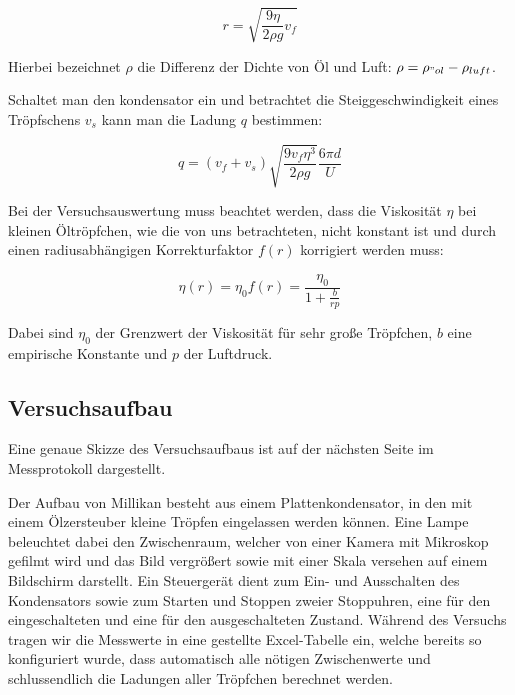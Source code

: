 \documentclass{article}
\begin{document}
\begin{equation}
    r = \sqrt{\frac{9\eta}{2\rho g}v_f}
    \label{eq:r}
\end{equation}

Hierbei bezeichnet $\rho$ die Differenz der Dichte von Öl und Luft: $\rho = \rho_{"ol} - \rho_{luft}$.

Schaltet man den kondensator ein und betrachtet die Steiggeschwindigkeit eines Tröpfschens $v_s$ kann man die Ladung $q$ bestimmen:

\begin{equation}
    q = (v_f + v_s) \sqrt{\frac{9v_f \eta^3}{2 \rho g}} \frac{6 \pi d}{U}
    \label{eq:q}
\end{equation}

Bei der Versuchsauswertung muss beachtet werden, dass die Viskosität $\eta$ bei kleinen Öltröpfchen, wie die von uns betrachteten, nicht konstant ist und durch einen radiusabhängigen Korrekturfaktor $f(r)$ korrigiert werden muss:

\begin{equation}
    \eta(r) = \eta_0 f(r) = \frac{\eta_0}{1+\frac{b}{rp}}
    \label{eq:eta}
\end{equation}

Dabei sind $\eta_0$ der Grenzwert der Viskosität für sehr große Tröpfchen, $b$ eine empirische Konstante und $p$ der Luftdruck. 

\subsection{Versuchsaufbau}

Eine genaue Skizze des Versuchsaufbaus ist auf der nächsten Seite im Messprotokoll dargestellt.

Der Aufbau von Millikan besteht aus einem Plattenkondensator, in den mit einem Ölzersteuber kleine Tröpfen eingelassen werden können. Eine Lampe beleuchtet dabei den Zwischenraum, welcher von einer Kamera mit Mikroskop gefilmt wird und das Bild vergrößert sowie mit einer Skala versehen auf einem Bildschirm darstellt. Ein Steuergerät dient zum Ein- und Ausschalten des Kondensators sowie zum Starten und Stoppen zweier Stoppuhren, eine für den eingeschalteten und eine für den ausgeschalteten Zustand. Während des Versuchs tragen wir die Messwerte in eine gestellte Excel-Tabelle ein, welche bereits so konfiguriert wurde, dass automatisch alle nötigen Zwischenwerte und schlussendlich die Ladungen aller Tröpfchen berechnet werden. 

\newpage
\end{document}
